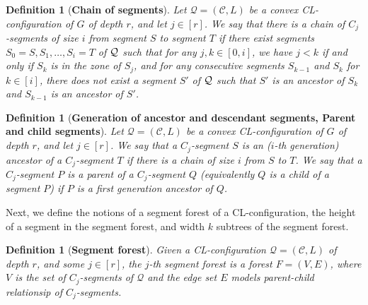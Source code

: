 \documentclass{article}
\newtheorem{definition}[theorem]{Definition}
\numberwithin{claimcounter}{lemma}
\begin{document}
\begin{definition}[\bf{Chain of segments}]
Let $\mathcal{Q}=(\mathcal{C},L)$ be a  convex CL-configuration of $G$  of depth $r$, and let $j\in[r]$.  
    We say that there is a \emph{chain of $C_j$-segments of size $i$} from segment $S$ to segment $T$ if there exist segments $S_0 = S, S_1, \dots, S_i = T$ of ${\cal Q}$ such that for any $j, k \in [0,i]$, we have $j<k $ if and only if $S_k$ is in the zone of $S_j$, and for any consecutive segments $S_{k-1}$ and $ S_k$ for $k\in [i]$, there does not exist a segment $S'$ of ${\cal Q}$ such that $S'$ is an ancestor of $S_{k}$ and $S_{k-1}$ is an ancestor of $S'$.
\end{definition}


\begin{definition}[\bf{Generation of ancestor and descendant segments, Parent and child segments}]
Let $\mathcal{Q}=(\mathcal{C},L)$ be a  convex CL-configuration of $G$ of depth $r$, and let $j\in[r]$.
    We say that a $C_j$-segment $S$ is an \emph{($i$-th generation) ancestor} of a $C_j$-segment $T$ if there is a chain of size $i$ from $S$ to $T$. We say that a $C_j$-segment $P$ is a \emph{parent} of a $C_j$-segment $Q$ (equivalently $Q$ is a \emph{child} of a segment $P$) if $P$ is a first generation ancestor of $Q$.
\end{definition}

Next, we define the notions of a segment forest of a CL-configuration, the height of a segment in the  segment forest, and width $k$ subtrees of the segment forest. 


\begin{definition}[\bf{Segment forest}]
    Given a CL-configuration $\mathcal{Q}=(\mathcal{C},L)$ of depth $r$, and some $j \in [r]$, the \emph{$j$-th segment forest} is a forest $F = (V,E)$, where $V$ is the set of $C_j$-segments of $\mathcal{Q}$ and the edge set $E$ models parent-child relationsip of $C_j$-segments. 
\end{definition}
\end{document}
